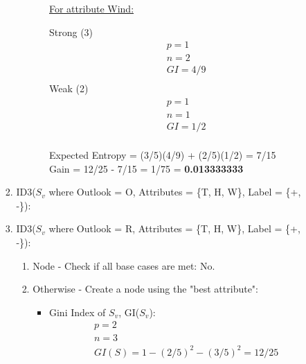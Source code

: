 \documentclass[8pt, fullpage,letterpaper]{article}
\begin{document}
\begin{enumerate}
\begin{enumerate}
\begin{enumerate}
\begin{enumerate}
\begin{itemize}
						\underline {For attribute Wind:} 
							\vspace{-5pt}
							\begin{multicols}{2}
								Strong (3)
			 						\begin{align*}
									    	& p = 1\\
										& n = 2 \\
									    	& GI = 4/9\\
								      \end{align*}
								Weak (2)
			 						\begin{align*}
									    	& p = 1\\
										& n = 1 \\
									    	& GI = 1/2\\
								      \end{align*}
							\end{multicols}
							\vspace{-20pt}
							Expected Entropy = (3/5)(4/9) + (2/5)(1/2) = 7/15\\
							Gain = 12/25 - 7/15 = 1/75 = {\bf 0.013333333}\\

					\centerline{}	
				\end{itemize}	
			\end{enumerate}


	 	\item ID3($S_v$ where Outlook = O, Attributes = \{T, H, W\}, Label = \{+, -\}): 
				\centerline{}	



	 	\item ID3($S_v$ where Outlook = R, Attributes = \{T, H, W\}, Label = \{+, -\}): 
			\begin{enumerate}
			\item Node - Check if all base cases are met: {\color{red} No}.
			\item Otherwise - Create a node using the "best attribute":
				\begin{itemize}
					\item Gini Index of $S_v$, GI($S_v$):
						\begin{align*}
						    	& p = 2\\
							& n = 3 \\
						    	& GI(S) = 1 - (2/5)^2 - (3/5)^2 = 12/25
					      \end{align*}


\end{itemize}
\end{enumerate}
\end{enumerate}
\end{enumerate}
\end{enumerate}
\end{document}
